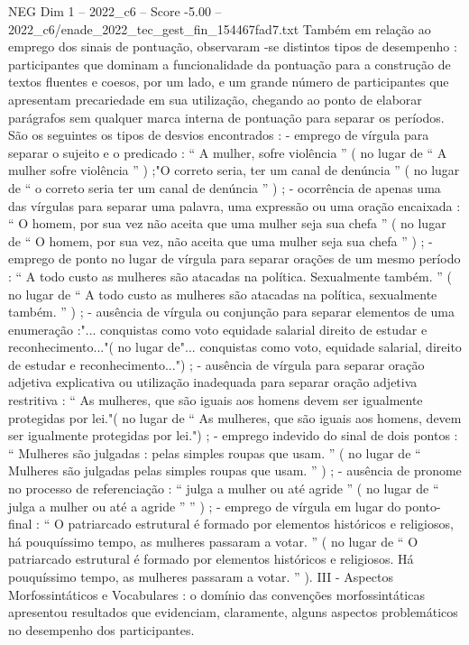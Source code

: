 \begin{textsample}{NEG Dim 1 – 2022\_c6 – Score -5.00 – 2022\_c6/enade\_2022\_tec\_gest\_fin\_154467fad7.txt}
Também em relação ao emprego dos sinais de pontuação, observaram -se distintos tipos de desempenho : participantes que dominam a funcionalidade da pontuação para a construção de textos fluentes e coesos, por um lado, e um grande número de participantes que apresentam precariedade em sua utilização, chegando ao ponto de elaborar parágrafos sem qualquer marca interna de pontuação para separar os períodos.
São os seguintes os tipos de desvios encontrados : - emprego de vírgula para separar o sujeito e o predicado : “ A mulher, sofre violência ” ( no lugar de “ A mulher sofre violência ” ) ;"O correto seria, ter um canal de denúncia ” ( no lugar de “ o correto seria ter um canal de denúncia ” ) ; - ocorrência de apenas uma das vírgulas para separar uma palavra, uma expressão ou uma oração encaixada : “ O homem, por sua vez não aceita que uma mulher seja sua chefa ” ( no lugar de “ O homem, por sua vez, não aceita que uma mulher seja sua chefa ” ) ; - emprego de ponto no lugar de vírgula para separar orações de um mesmo período : “ A todo custo as mulheres são atacadas na política.
Sexualmente também. ” ( no lugar de “ A todo custo as mulheres são atacadas na política, sexualmente também. ” ) ; - ausência de vírgula ou conjunção para separar elementos de uma enumeração :"... conquistas como voto equidade salarial direito de estudar e reconhecimento..."( no lugar de"... conquistas como voto, equidade salarial, direito de estudar e reconhecimento...") ; - ausência de vírgula para separar oração adjetiva explicativa ou utilização inadequada para separar oração adjetiva restritiva : “ As mulheres, que são iguais aos homens devem ser igualmente protegidas por lei."( no lugar de “ As mulheres, que são iguais aos homens, devem ser igualmente protegidas por lei.") ; - emprego indevido do sinal de dois pontos : “ Mulheres são julgadas : pelas simples roupas que usam. ” ( no lugar de “ Mulheres são julgadas pelas simples roupas que usam. ” ) ; - ausência de pronome no processo de referenciação : “ julga a mulher ou até agride ” ( no lugar de “ julga a mulher ou até a agride ” ” ) ; - emprego de vírgula em lugar do ponto-final : “ O patriarcado estrutural é formado por elementos históricos e religiosos, há pouquíssimo tempo, as mulheres passaram a votar. ” ( no lugar de “ O patriarcado estrutural é formado por elementos históricos e religiosos.
Há pouquíssimo tempo, as mulheres passaram a votar. ” ).
III - Aspectos Morfossintáticos e Vocabulares : o domínio das convenções morfossintáticas apresentou resultados que evidenciam, claramente, alguns aspectos problemáticos no desempenho dos participantes.

\end{textsample}
